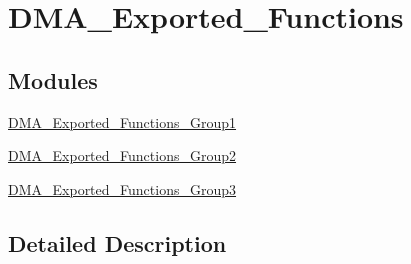 \hypertarget{group___d_m_a___exported___functions}{}\section{D\+M\+A\+\_\+\+Exported\+\_\+\+Functions}
\label{group___d_m_a___exported___functions}
\subsection*{Modules}
\begin{DoxyCompactItemize}
\item 
\hyperlink{group___d_m_a___exported___functions___group1}{D\+M\+A\+\_\+\+Exported\+\_\+\+Functions\+\_\+\+Group1}
\item 
\hyperlink{group___d_m_a___exported___functions___group2}{D\+M\+A\+\_\+\+Exported\+\_\+\+Functions\+\_\+\+Group2}
\item 
\hyperlink{group___d_m_a___exported___functions___group3}{D\+M\+A\+\_\+\+Exported\+\_\+\+Functions\+\_\+\+Group3}
\end{DoxyCompactItemize}


\subsection{Detailed Description}
